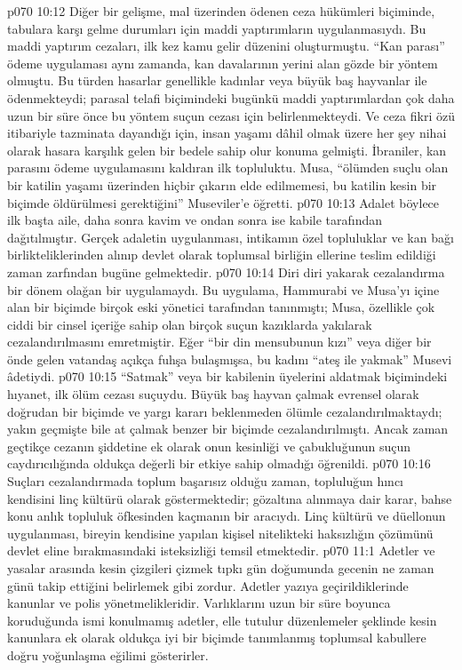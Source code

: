 \vs p070 10:12 Diğer bir gelişme, mal üzerinden ödenen ceza hükümleri biçiminde, tabulara karşı gelme durumları için maddi yaptırımların uygulanmasıydı. Bu maddi yaptırım cezaları, ilk kez kamu gelir düzenini oluşturmuştu. “Kan parası” ödeme uygulaması aynı zamanda, kan davalarının yerini alan gözde bir yöntem olmuştu. Bu türden hasarlar genellikle kadınlar veya büyük baş hayvanlar ile ödenmekteydi; parasal telafi biçimindeki bugünkü maddi yaptırımlardan çok daha uzun bir süre önce bu yöntem suçun cezası için belirlenmekteydi. Ve ceza fikri özü itibariyle tazminata dayandığı için, insan yaşamı dâhil olmak üzere her şey nihai olarak hasara karşılık gelen bir bedele sahip olur konuma gelmişti. İbraniler, kan parasını ödeme uygulamasını kaldıran ilk topluluktu. Musa, “ölümden suçlu olan bir katilin yaşamı üzerinden hiçbir çıkarın elde edilmemesi, bu katilin kesin bir biçimde öldürülmesi gerektiğini” Museviler’e öğretti.
\vs p070 10:13 Adalet böylece ilk başta aile, daha sonra kavim ve ondan sonra ise kabile tarafından dağıtılmıştır. Gerçek adaletin uygulanması, intikamın özel topluluklar ve kan bağı birlikteliklerinden alınıp devlet olarak toplumsal birliğin ellerine teslim edildiği zaman zarfından bugüne gelmektedir.
\vs p070 10:14 Diri diri yakarak cezalandırma bir dönem olağan bir uygulamaydı. Bu uygulama, Hammurabi ve Musa’yı içine alan bir biçimde birçok eski yönetici tarafından tanınmıştı; Musa, özellikle çok ciddi bir cinsel içeriğe sahip olan birçok suçun kazıklarda yakılarak cezalandırılmasını emretmiştir. Eğer “bir din mensubunun kızı” veya diğer bir önde gelen vatandaş açıkça fuhşa bulaşmışsa, bu kadını “ateş ile yakmak” Musevi âdetiydi.
\vs p070 10:15 “Satmak” veya bir kabilenin üyelerini aldatmak biçimindeki hıyanet, ilk ölüm cezası suçuydu. Büyük baş hayvan çalmak evrensel olarak doğrudan bir biçimde ve yargı kararı beklenmeden ölümle cezalandırılmaktaydı; yakın geçmişte bile at çalmak benzer bir biçimde cezalandırılmıştı. Ancak zaman geçtikçe cezanın şiddetine ek olarak onun kesinliği ve çabukluğunun suçun caydırıcılığında oldukça değerli bir etkiye sahip olmadığı öğrenildi.
\vs p070 10:16 Suçları cezalandırmada toplum başarısız olduğu zaman, topluluğun hıncı kendisini linç kültürü olarak göstermektedir; gözaltına alınmaya dair karar, bahse konu anlık topluluk öfkesinden kaçmanın bir aracıydı. Linç kültürü ve düellonun uygulanması, bireyin kendisine yapılan kişisel nitelikteki haksızlığın çözümünü devlet eline bırakmasındaki isteksizliği temsil etmektedir.
\vs p070 11:1 Adetler ve yasalar arasında kesin çizgileri çizmek tıpkı gün doğumunda gecenin ne zaman günü takip ettiğini belirlemek gibi zordur. Adetler yazıya geçirildiklerinde kanunlar ve polis yönetmelikleridir. Varlıklarını uzun bir süre boyunca koruduğunda ismi konulmamış adetler, elle tutulur düzenlemeler şeklinde kesin kanunlara ek olarak oldukça iyi bir biçimde tanımlanmış toplumsal kabullere doğru yoğunlaşma eğilimi gösterirler.
